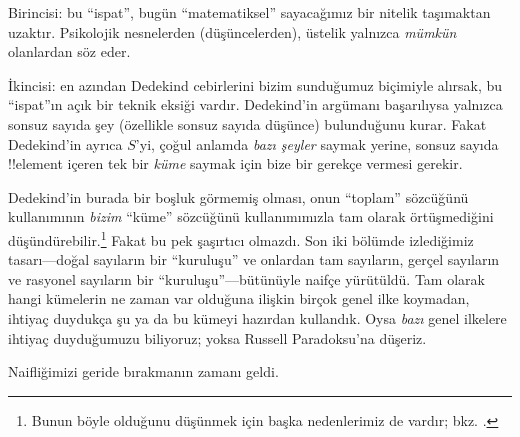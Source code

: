 Birincisi: bu ``ispat'', bugün ``matematiksel'' sayacağımız bir nitelik
taşımaktan uzaktır. Psikolojik nesnelerden (düşüncelerden), üstelik yalnızca
\emph{mümkün} olanlardan söz eder.

İkincisi: en azından Dedekind cebirlerini bizim sunduğumuz biçimiyle
alırsak, bu ``ispat''ın açık bir teknik eksiği vardır. Dedekind'in argümanı
başarılıysa yalnızca sonsuz sayıda şey (özellikle sonsuz sayıda düşünce)
bulunduğunu kurar. Fakat Dedekind'in ayrıca $S$'yi, çoğul anlamda
\emph{bazı şeyler} saymak yerine, sonsuz sayıda !!{element} içeren tek bir
\emph{küme} saymak için bize bir gerekçe vermesi gerekir.

Dedekind'in burada bir boşluk görmemiş olması, onun ``toplam'' sözcüğünü
kullanımının \emph{bizim} ``küme'' sözcüğünü kullanımımızla tam olarak
örtüşmediğini düşündürebilir.\footnote{Bunun böyle olduğunu düşünmek için
başka nedenlerimiz de vardır; bkz. \citet[p.~23]{Potter2004}.} Fakat bu pek
şaşırtıcı olmazdı. Son iki bölümde izlediğimiz tasarı---doğal sayıların bir
``kuruluşu'' ve onlardan tam sayıların, gerçel sayıların ve rasyonel sayıların
bir ``kuruluşu''---bütünüyle naifçe yürütüldü. Tam olarak hangi kümelerin ne
zaman var olduğuna ilişkin birçok genel ilke koymadan, ihtiyaç duydukça şu ya
da bu kümeyi hazırdan kullandık. Oysa \emph{bazı} genel ilkelere ihtiyaç
duyduğumuzu biliyoruz; yoksa Russell Paradoksu'na düşeriz.

Naifliğimizi geride bırakmanın zamanı geldi.

